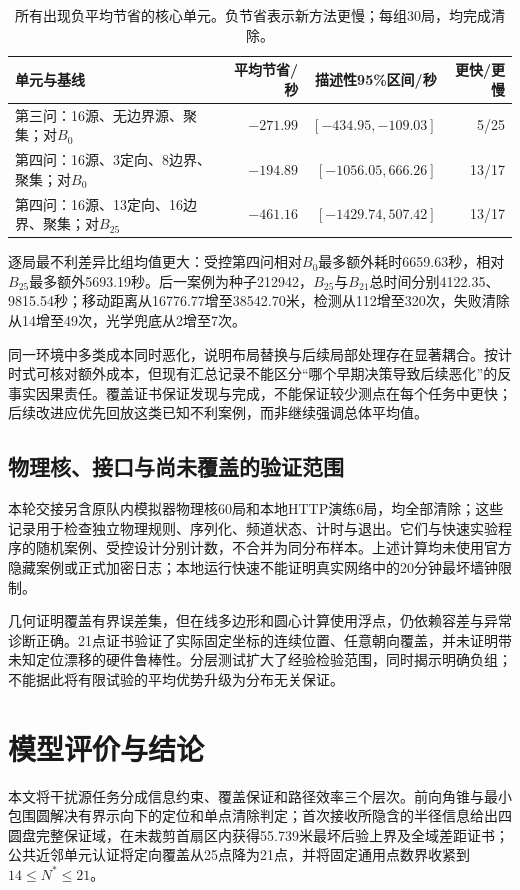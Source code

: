 \documentclass[UTF8,a4paper,zihao=-4,fontset=mac]{ctexart}
\begin{document}
\begin{table}[H]\centering\small
\caption{所有出现负平均节省的核心单元。负节省表示新方法更慢；每组30局，均完成清除。}\label{tab:negative}
\begin{tabular}{p{5.6cm}rrr}\toprule
单元与基线 & 平均节省/秒 & 描述性95\%区间/秒 & 更快/更慢\\\midrule
第三问：16源、无边界源、聚集；对$B_0$ & $-271.99$ & $[-434.95,-109.03]$ &5/25\\
第四问：16源、3定向、8边界、聚集；对$B_0$ & $-194.89$ & $[-1056.05,666.26]$ &13/17\\
第四问：16源、13定向、16边界、聚集；对$B_{25}$ & $-461.16$ & $[-1429.74,507.42]$ &13/17\\\bottomrule
\end{tabular}
\end{table}
逐局最不利差异比组均值更大：受控第四问相对$B_0$最多额外耗时6659.63秒，相对$B_{25}$最多额外5693.19秒。后一案例为种子212942，$B_{25}$与$B_{21}$总时间分别4122.35、9815.54秒；移动距离从16776.77增至38542.70米，检测从112增至320次，失败清除从14增至49次，光学兜底从2增至7次。

同一环境中多类成本同时恶化，说明布局替换与后续局部处理存在显著耦合。按计时式可核对额外成本，但现有汇总记录不能区分“哪个早期决策导致后续恶化”的反事实因果责任。覆盖证书保证发现与完成，不能保证较少测点在每个任务中更快；后续改进应优先回放这类已知不利案例，而非继续强调总体平均值。

\subsection{物理核、接口与尚未覆盖的验证范围}
本轮交接另含原队内模拟器物理核60局和本地HTTP演练6局，均全部清除；这些记录用于检查独立物理规则、序列化、频道状态、计时与退出。它们与快速实验程序的随机案例、受控设计分别计数，不合并为同分布样本。上述计算均未使用官方隐藏案例或正式加密日志；本地运行快速不能证明真实网络中的20分钟最坏墙钟限制。

几何证明覆盖有界误差集，但在线多边形和圆心计算使用浮点，仍依赖容差与异常诊断正确。21点证书验证了实际固定坐标的连续位置、任意朝向覆盖，并未证明带未知定位漂移的硬件鲁棒性。分层测试扩大了经验检验范围，同时揭示明确负组；不能据此将有限试验的平均优势升级为分布无关保证。

\section{模型评价与结论}
本文将干扰源任务分成信息约束、覆盖保证和路径效率三个层次。前向角锥与最小包围圆解决有界示向下的定位和单点清除判定；首次接收所隐含的半径信息给出四圆盘完整保证域，在未裁剪首扇区内获得55.739米最坏后验上界及全域差距证书；公共近邻单元认证将定向覆盖从25点降为21点，并将固定通用点数界收紧到$14\le N^*\le21$。
\end{document}
